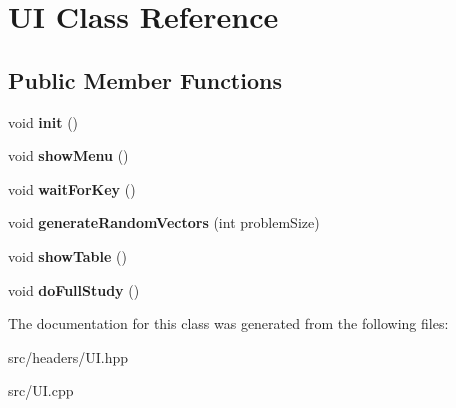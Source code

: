 \hypertarget{classUI}{\section{U\-I Class Reference}
\label{classUI}
}
\subsection*{Public Member Functions}
\begin{DoxyCompactItemize}
\item 
\hypertarget{classUI_a2277decc2cba013de2fbb5a64fbc1543}{void {\bfseries init} ()}\label{classUI_a2277decc2cba013de2fbb5a64fbc1543}

\item 
\hypertarget{classUI_ae84bafbd5341a1e6759a89c7ccad0ae8}{void {\bfseries show\-Menu} ()}\label{classUI_ae84bafbd5341a1e6759a89c7ccad0ae8}

\item 
\hypertarget{classUI_ad929a7c850dcd2ff808f2c59be212f6a}{void {\bfseries wait\-For\-Key} ()}\label{classUI_ad929a7c850dcd2ff808f2c59be212f6a}

\item 
\hypertarget{classUI_ae27c365b6cd8088b7f33a4ac1e6fae3b}{void {\bfseries generate\-Random\-Vectors} (int problem\-Size)}\label{classUI_ae27c365b6cd8088b7f33a4ac1e6fae3b}

\item 
\hypertarget{classUI_ae904f4472bdce87941827fff6c90c1e1}{void {\bfseries show\-Table} ()}\label{classUI_ae904f4472bdce87941827fff6c90c1e1}

\item 
\hypertarget{classUI_a2c28ee34efdf4c0e6e93cbc7e0314cbc}{void {\bfseries do\-Full\-Study} ()}\label{classUI_a2c28ee34efdf4c0e6e93cbc7e0314cbc}

\end{DoxyCompactItemize}


The documentation for this class was generated from the following files\-:\begin{DoxyCompactItemize}
\item 
src/headers/U\-I.\-hpp\item 
src/U\-I.\-cpp\end{DoxyCompactItemize}
